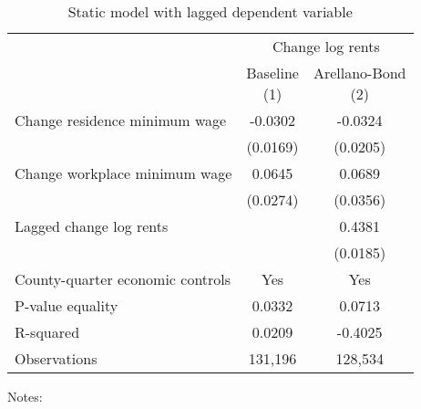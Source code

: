 \begin{table}
    \caption{Static model with lagged dependent variable}
    \label{tab:static_ab}

    \begin{tabular}{@{}lcc@{}}
        \toprule
                               & \multicolumn{2}{c}{Change log rents}                       \\ \cmidrule(l){2-3}
                               & \shortsack{Baseline\\(1)} & \shortsack{Arellano-Bond\\(2)} \\ \midrule
        Change residence minimum wage     &  -0.0302           &  -0.0324                           \\
                                          & (0.0169)          & (0.0205)                          \\
        Change workplace minimum wage     &  0.0645           & 0.0689                            \\
                                          & (0.0274)          & (0.0356)                          \\
        Lagged change log rents           &                & 0.4381                            \\
                                          &                & (0.0185)                          \\ \midrule
        County-quarter economic controls  & Yes            & Yes                            \\
        P-value equality                  & 0.0332            & 0.0713                            \\
        R-squared                         & 0.0209            & -0.4025                            \\
        Observations                      & 131,196           & 128,534                           \\ \bottomrule
    \end{tabular}

    \begin{minipage}{.95\textwidth} \footnotesize
        \vspace{2mm}
        Notes: 
    \end{minipage}
\end{table}
